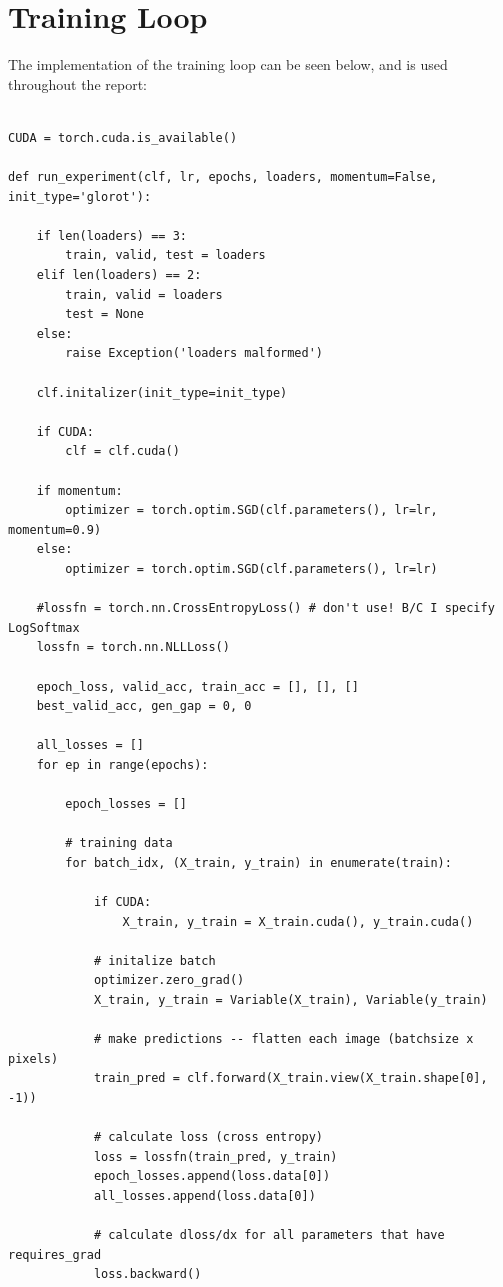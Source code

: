 \documentclass{amsart}
\theoremstyle{definition}
\theoremstyle{remark}
\numberwithin{equation}{section}
\begin{document}
\section{Training Loop}

The implementation of the training loop can be seen below, and is used throughout
the report: \\

\begin{lstlisting}[breaklines]

CUDA = torch.cuda.is_available()

def run_experiment(clf, lr, epochs, loaders, momentum=False, init_type='glorot'):

    if len(loaders) == 3:
        train, valid, test = loaders
    elif len(loaders) == 2:
        train, valid = loaders
        test = None
    else:
        raise Exception('loaders malformed')

    clf.initalizer(init_type=init_type)

    if CUDA:
        clf = clf.cuda()

    if momentum:
        optimizer = torch.optim.SGD(clf.parameters(), lr=lr, momentum=0.9)
    else:
        optimizer = torch.optim.SGD(clf.parameters(), lr=lr)

    #lossfn = torch.nn.CrossEntropyLoss() # don't use! B/C I specify LogSoftmax
    lossfn = torch.nn.NLLLoss()

    epoch_loss, valid_acc, train_acc = [], [], []
    best_valid_acc, gen_gap = 0, 0

    all_losses = []
    for ep in range(epochs):

        epoch_losses = []

        # training data
        for batch_idx, (X_train, y_train) in enumerate(train):

            if CUDA:
                X_train, y_train = X_train.cuda(), y_train.cuda()

            # initalize batch
            optimizer.zero_grad()
            X_train, y_train = Variable(X_train), Variable(y_train)

            # make predictions -- flatten each image (batchsize x pixels)
            train_pred = clf.forward(X_train.view(X_train.shape[0], -1))

            # calculate loss (cross entropy)
            loss = lossfn(train_pred, y_train)
            epoch_losses.append(loss.data[0])
            all_losses.append(loss.data[0])

            # calculate dloss/dx for all parameters that have requires_grad
            loss.backward()


\end{lstlisting}
\end{document}
